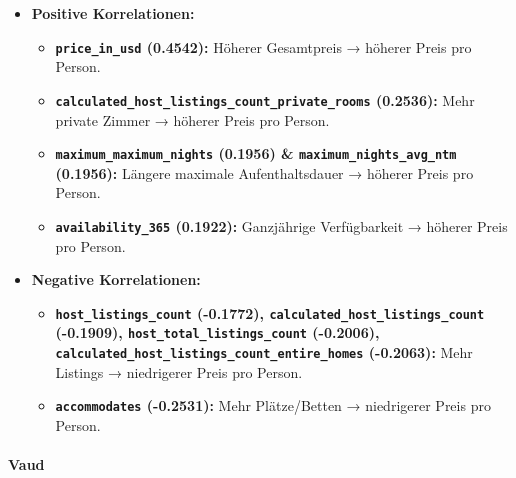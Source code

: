 \documentclass[
  journal,
]{IEEEtran}%
\let\oldparagraph\paragraph
\renewcommand{\paragraph}[1]{\oldparagraph{#1}\mbox{}}
\providecommand{\tightlist}{%
  \setlength{\itemsep}{0pt}\setlength{\parskip}{0pt}}\usepackage{longtable,booktabs,array}
\begin{document}
\begin{itemize}
\item
  \textbf{Positive Korrelationen:}

  \begin{itemize}
  \tightlist
  \item
    \textbf{\texttt{price\_in\_usd} (0.4542):} Höherer Gesamtpreis →
    höherer Preis pro Person.
  \item
    \textbf{\texttt{calculated\_host\_listings\_count\_private\_rooms}
    (0.2536):} Mehr private Zimmer → höherer Preis pro Person.
  \item
    \textbf{\texttt{maximum\_maximum\_nights} (0.1956) \&
    \texttt{maximum\_nights\_avg\_ntm} (0.1956):} Längere maximale
    Aufenthaltsdauer → höherer Preis pro Person.
  \item
    \textbf{\texttt{availability\_365} (0.1922):} Ganzjährige
    Verfügbarkeit → höherer Preis pro Person.
  \end{itemize}
\item
  \textbf{Negative Korrelationen:}

  \begin{itemize}
  \tightlist
  \item
    \textbf{\texttt{host\_listings\_count} (-0.1772),
    \texttt{calculated\_host\_listings\_count} (-0.1909),
    \texttt{host\_total\_listings\_count} (-0.2006),
    \texttt{calculated\_host\_listings\_count\_entire\_homes}
    (-0.2063):} Mehr Listings → niedrigerer Preis pro Person.
  \item
    \textbf{\texttt{accommodates} (-0.2531):} Mehr Plätze/Betten →
    niedrigerer Preis pro Person.
  \end{itemize}
\end{itemize}

\hypertarget{vaud}{%
\paragraph{Vaud}\label{vaud}}
\end{document}
